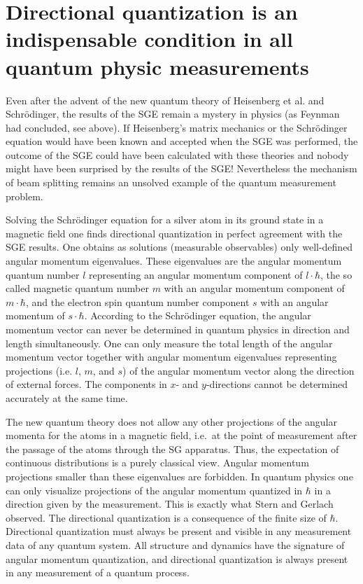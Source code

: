 \documentclass{article}
\begin{document}
\section{Directional quantization is an indispensable condition in all quantum physic measurements}

Even after the advent of the new quantum theory of Heisenberg et al. and Schrödinger, 
the results of the SGE remain a mystery in physics (as Feynman had concluded, see above). If Heisenberg's matrix mechanics or the Schrödinger equation would have been known and accepted when the SGE was performed, the outcome of the SGE could have been calculated with these theories and nobody might have been surprised by the results of the SGE! Nevertheless the mechanism of beam splitting remains an unsolved example of the quantum measurement problem. 

Solving the Schrödinger equation for a silver atom in its ground state in a magnetic field one finds directional quantization in perfect agreement with the SGE results. One obtains as solutions (measurable observables) only well-defined angular momentum eigenvalues. These eigenvalues are the angular momentum quantum number $l$ representing an angular momentum component of $l\cdot\hbar$, the so called magnetic quantum number $m$ with an angular momentum component of $m\cdot\hbar$, and the electron spin quantum number component $s$ with an angular momentum of $s\cdot\hbar$. According to the Schrödinger equation, the angular momentum vector can never be determined in quantum physics in direction and length simultaneously. One can only measure the total length of the angular momentum vector together with angular momentum eigenvalues representing projections (i.e. $l$, $m$, and $s$) of the angular momentum vector along the direction of external forces. The components in $x$- and $y$-directions cannot be determined accurately at the same time. 

The new quantum theory does not allow any other projections of the angular momenta for the atoms in a magnetic field, i.e.\ at the point of measurement after the passage of the atoms through the SG apparatus. Thus, the expectation of continuous distributions is a purely classical view. Angular momentum projections smaller than these eigenvalues are forbidden. In quantum physics one can only visualize projections of the angular momentum quantized in $\hbar$ in a direction given by the measurement. This is exactly what Stern and Gerlach observed. The directional quantization is a consequence of the finite size of $\hbar$. Directional quantization must always be present and visible in any measurement data of any quantum system. All structure and dynamics have the signature of angular momentum quantization, and directional quantization is always present in any measurement of a quantum process. 
\end{document}
